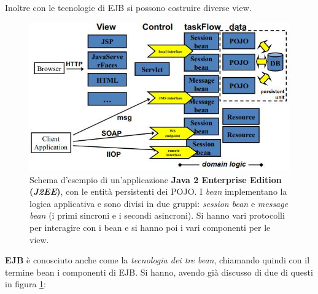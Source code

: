 \documentclass[a4paper,12pt, oneside]{book}
\begin{document}
Inoltre con le tecnologie di EJB si possono costruire diverse view.
\begin{figure}[H]
  \centering
  \includegraphics[scale = 0.65]{img/ejb.jpg}
  \caption{Schema d'esempio di un'applicazione \textbf{Java 2 Enterprise Edition
      (\textit{J2EE})}, con le entità persistenti dei POJO. I \textit{bean}
    implementano 
    la logica applicativa e sono divisi in due gruppi: \textit{session bean} e
    \textit{message bean} (i primi sincroni e i secondi asincroni). Si hanno
    vari protocolli per interagire con i bean e si hanno poi i vari componenti
    per le view.}
  \label{fig:ejb}
\end{figure}
\textbf{EJB} è conosciuto anche come la \textit{tecnologia dei tre bean},
chiamando quindi con il termine bean i componenti di EJB. Si hanno, avendo già
discusso di due di questi in figura \ref{fig:ejb}:
\end{document}
